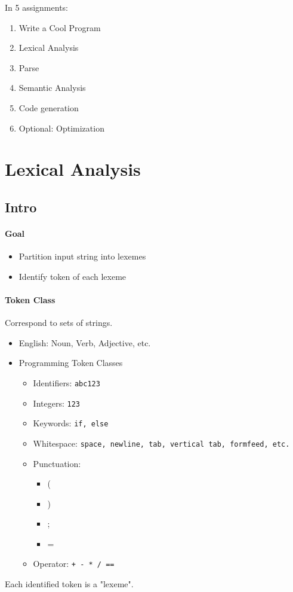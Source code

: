 \documentclass[a4paper, 10pt]{article}
\begin{document}
In 5 assignments:
\begin{enumerate}
	\item Write a Cool Program
	\item Lexical Analysis
	\item Parse
	\item Semantic Analysis
	\item Code generation
	\item Optional: Optimization
\end{enumerate}
\section{Lexical Analysis}
\subsection{Intro}
\paragraph{Goal}
\begin{itemize}
	\item Partition input string into lexemes
	\item Identify token of each lexeme
\end{itemize}
\paragraph{Token Class}
Correspond to sets of strings.
\begin{itemize}
	\item English: Noun, Verb, Adjective, etc.
	\item Programming Token Classes
	      \begin{itemize}
		      \item Identifiers: \texttt{abc123}
		      \item Integers: \texttt{123}
		      \item Keywords: \texttt{if, else}
		      \item Whitespace: \texttt{space, newline, tab, vertical tab, formfeed, etc.}
		      \item Punctuation:
		            \begin{itemize}
			            \item (
			            \item )
			            \item ;
			            \item =
		            \end{itemize}
		      \item Operator: \texttt{+ - * / ==}
	      \end{itemize}
\end{itemize}
\newline Each identified token is a "lexeme".
\end{document}
